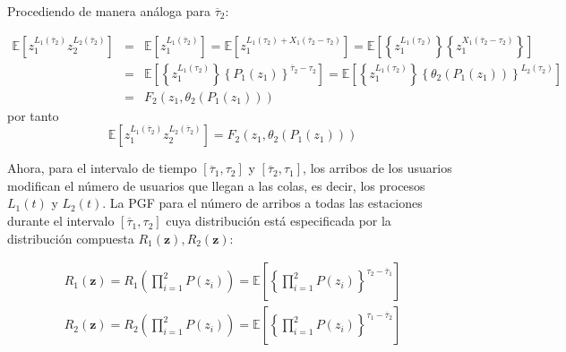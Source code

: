 \documentclass{article}
\newcommand{\esp}{\mathbb{E}}
\begin{document}
Procediendo de manera an\'aloga para $\overline{\tau}_{2}$:

\begin{eqnarray*}
\esp\left[z_{1}^{L_{1}\left(\overline{\tau}_{2}\right)}z_{2}^{L_{2}\left(\overline{\tau}_{2}\right)}\right]&=&\esp\left[z_{1}^{L_{1}\left(\overline{\tau}_{2}\right)}\right]=\esp\left[z_{1}^{L_{1}\left(\tau_{2}\right)+X_{1}\left(\overline{\tau}_{2}-\tau_{2}\right)}\right]=\esp\left[\left\{z_{1}^{L_{1}\left(\tau_{2}\right)}\right\}\left\{z_{1}^{X_{1}\left(\overline{\tau}_{2}-\tau_{2}\right)}\right\}\right]\\
&=&\esp\left[\left\{z_{1}^{L_{1}\left(\tau_{2}\right)}\right\}\left\{P_{1}\left(z_{1}\right)\right\}^{\overline{\tau}_{2}-\tau_{2}}\right]=\esp\left[\left\{z_{1}^{L_{1}\left(\tau_{2}\right)}\right\}\left\{\theta_{2}\left(P_{1}\left(z_{1}\right)\right)\right\}^{L_{2}\left(\tau_{2}\right)}\right]\\
&=&F_{2}\left(z_{1},\theta_{2}\left(P_{1}\left(z_{1}\right)\right)\right)
\end{eqnarray*}
por tanto
\begin{equation}\label{Eq.PGF.Conjunta.Tau2}
\esp\left[z_{1}^{L_{1}\left(\overline{\tau}_{2}\right)}z_{2}^{L_{2}\left(\overline{\tau}_{2}\right)}\right]=F_{2}\left(z_{1},\theta_{2}\left(P_{1}\left(z_{1}\right)\right)\right)
\end{equation}

Ahora, para el intervalo de tiempo
$\left[\overline{\tau}_{1},\tau_{2}\right]$ y $\left[\overline{\tau}_{2},\tau_{1}\right]$, los arribos de los usuarios modifican el n\'umero de usuarios que llegan a las colas, es decir, los procesos
$L_{1}\left(t\right)$ y $L_{2}\left(t\right)$. La PGF para el n\'umero de arribos a todas las estaciones durante el intervalo $\left[\overline{\tau}_{1},\tau_{2}\right]$  cuya distribuci\'on est\'a especificada por la distribuci\'on compuesta $R_{1}\left(\mathbf{z}\right),R_{2}\left(\mathbf{z}\right)$:

\begin{eqnarray*}
R_{1}\left(\mathbf{z}\right)=R_{1}\left(\prod_{i=1}^{2}P\left(z_{i}\right)\right)=\esp\left[\left\{\prod_{i=1}^{2}P\left(z_{i}\right)\right\}^{\tau_{2}-\overline{\tau}_{1}}\right]\\
R_{2}\left(\mathbf{z}\right)=R_{2}\left(\prod_{i=1}^{2}P\left(z_{i}\right)\right)=\esp\left[\left\{\prod_{i=1}^{2}P\left(z_{i}\right)\right\}^{\tau_{1}-\overline{\tau}_{2}}\right]\\
\end{eqnarray*}
\end{document}
